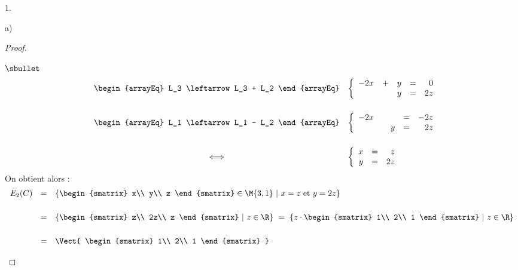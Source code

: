 \begin{noliste}{1.}
\begin{noliste}{a)}
\begin{proof}
\begin{noliste}{$\sbullet$}
\[\begin{array}{rcl}
          &
          \begin{arrayEq}
            L_3 \leftarrow L_3 + L_2
          \end{arrayEq}
          &
          \left\{
            \begin{array}{rrrcr}
              -2x & + & y & = & 0\\
              & & y & = & 2z
            \end{array}
          \right.
          \\[.8cm]
          &
          \begin{arrayEq}
            L_1 \leftarrow L_1 - L_2
          \end{arrayEq}
          &
          \left\{
            \begin{array}{rrrcr}
              -2x & & & = & -2z\\
              & & y & = & 2z
            \end{array}
          \right.
          \\[.8cm]
          & \Longleftrightarrow & 
          \left\{
            \begin{array}{rcr}
              x & = & z\\
              y & = & 2z
            \end{array}
          \right.
	\end{array}
	\]	
	On obtient alors :
	\[
	\begin{array}{rcl}
          E_2(C) & = & \{
          \begin{smatrix}
            x\\
            y\\
            z
          \end{smatrix}
          \in \M{3,1}
          \ | \ 
          x=z \mbox{ et } y=2z \}
          \\[.6cm]
          & = & \{
          \begin{smatrix}
            z\\
            2z\\
            z
          \end{smatrix}
          \ | \ 
          z \in\R \}
          \ = \ \{z \cdot
          \begin{smatrix}
            1\\
            2\\
            1
          \end{smatrix}
          \ | \ 
          z \in\R \}
          \\[.6cm]
          & = & \Vect{
            \begin{smatrix}
              1\\
              2\\
              1
            \end{smatrix}
          }
        \end{array}
	\]
	

\end{noliste}
\end{proof}
\end{noliste}
\end{noliste}

